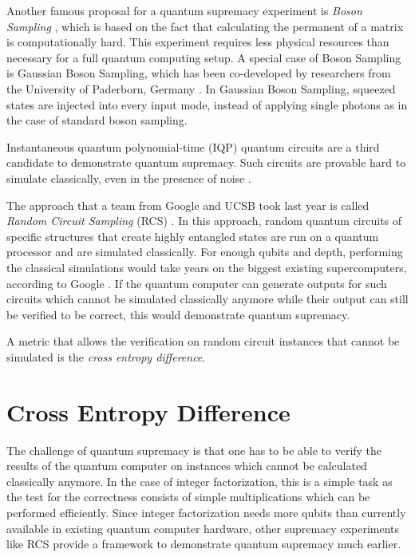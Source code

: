 Another famous proposal for a quantum supremacy experiment is \textit{Boson Sampling} \cite{aaronson2013boson}, which is based on the
fact that calculating the permanent of a matrix is computationally hard. This experiment requires less 
physical resources than necessary for a full quantum computing setup. A special case of 
Boson Sampling is Gaussian Boson Sampling, which has been co-developed by researchers 
from the University of Paderborn, Germany \cite{Hamilton2017}. In Gaussian Boson Sampling, squeezed states are injected 
into every input mode, instead of applying single photons as in the case of standard 
boson sampling.

Instantaneous quantum polynomial-time (IQP) quantum circuits are a third candidate to demonstrate 
quantum supremacy. Such circuits are provable hard to simulate classically, even in the presence of 
noise \cite{Bremner2017}.

The approach that a team from Google and UCSB took last year is called \textit{Random
  Circuit Sampling} (RCS) \cite{Boixo2018supremacy, martines2019supremacy}. In this approach, random quantum circuits of specific structures that create highly
entangled states are run on a quantum processor and are simulated classically. For
enough qubits and depth, performing the classical simulations would take years on the biggest 
existing supercomputers, according to Google \cite{martines2019supremacy}. If the quantum computer can generate outputs
for such circuits which cannot be simulated classically anymore while their output can still be
verified to be correct, this would demonstrate quantum supremacy. 

A metric that
allows the verification on random circuit instances that cannot be simulated is
the \textit{cross entropy difference}.

\section{Cross Entropy Difference}
\label{sec:cross_entropy}

The challenge of quantum supremacy is that one has to be able to verify the
results of the quantum computer on instances which cannot be calculated
classically anymore. In the case of integer factorization, this is a simple task
as the test for the correctness consists of simple multiplications which can be
performed efficiently. Since integer factorization needs more qubits than
currently available in existing quantum computer hardware, other supremacy
experiments like RCS provide a framework to demonstrate quantum supremacy much
earlier.


